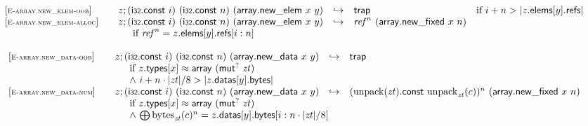 \vspace{1ex}

$$
\begin{array}[t]{@{}lrcl@{}l@{}}
{[\textsc{\scriptsize E{-}array.new\_elem{-}oob}]} \quad & z ; (\mathsf{i{\scriptstyle 32}}{.}\mathsf{const}~i)~(\mathsf{i{\scriptstyle 32}}{.}\mathsf{const}~n)~(\mathsf{array{.}new\_elem}~x~y) & \hookrightarrow & \mathsf{trap} & \quad \mbox{if}~ i + n > {|z{.}\mathsf{elems}{}[y]{.}\mathsf{refs}|} \\
{[\textsc{\scriptsize E{-}array.new\_elem{-}alloc}]} \quad & z ; (\mathsf{i{\scriptstyle 32}}{.}\mathsf{const}~i)~(\mathsf{i{\scriptstyle 32}}{.}\mathsf{const}~n)~(\mathsf{array{.}new\_elem}~x~y) & \hookrightarrow & {{\mathit{ref}}^{n}}~(\mathsf{array{.}new\_fixed}~x~n) &  \\
& \multicolumn{4}{@{}l@{}}{\quad
\quad \mbox{if}~ {{\mathit{ref}}^{n}} = z{.}\mathsf{elems}{}[y]{.}\mathsf{refs}{}[i : n]
} \\
\end{array}
$$

\vspace{1ex}

$$
\begin{array}[t]{@{}lrcl@{}l@{}}
{[\textsc{\scriptsize E{-}array.new\_data{-}oob}]} \quad & z ; (\mathsf{i{\scriptstyle 32}}{.}\mathsf{const}~i)~(\mathsf{i{\scriptstyle 32}}{.}\mathsf{const}~n)~(\mathsf{array{.}new\_data}~x~y) & \hookrightarrow & \mathsf{trap} &  \\
& \multicolumn{4}{@{}l@{}}{\quad
\quad
\begin{array}[t]{@{}l@{}}
\mbox{if}~ z{.}\mathsf{types}{}[x] \approx \mathsf{array}~({\mathsf{mut}^?}~{\mathit{zt}}) \\
{\land}~ i + n \cdot {|{\mathit{zt}}|} / 8 > {|z{.}\mathsf{datas}{}[y]{.}\mathsf{bytes}|} \\
\end{array}
} \\
{[\textsc{\scriptsize E{-}array.new\_data{-}num}]} \quad & z ; (\mathsf{i{\scriptstyle 32}}{.}\mathsf{const}~i)~(\mathsf{i{\scriptstyle 32}}{.}\mathsf{const}~n)~(\mathsf{array{.}new\_data}~x~y) & \hookrightarrow & {({\mathrm{unpack}}({\mathit{zt}}){.}\mathsf{const}~{{\mathrm{unpack}}}_{{\mathit{zt}}}(c))^{n}}~(\mathsf{array{.}new\_fixed}~x~n) &  \\
& \multicolumn{4}{@{}l@{}}{\quad
\quad
\begin{array}[t]{@{}l@{}}
\mbox{if}~ z{.}\mathsf{types}{}[x] \approx \mathsf{array}~({\mathsf{mut}^?}~{\mathit{zt}}) \\
{\land}~ {\bigoplus}\, {{{\mathrm{bytes}}}_{{\mathit{zt}}}(c)^{n}} = z{.}\mathsf{datas}{}[y]{.}\mathsf{bytes}{}[i : n \cdot {|{\mathit{zt}}|} / 8] \\
\end{array}
} \\
\end{array}
$$

